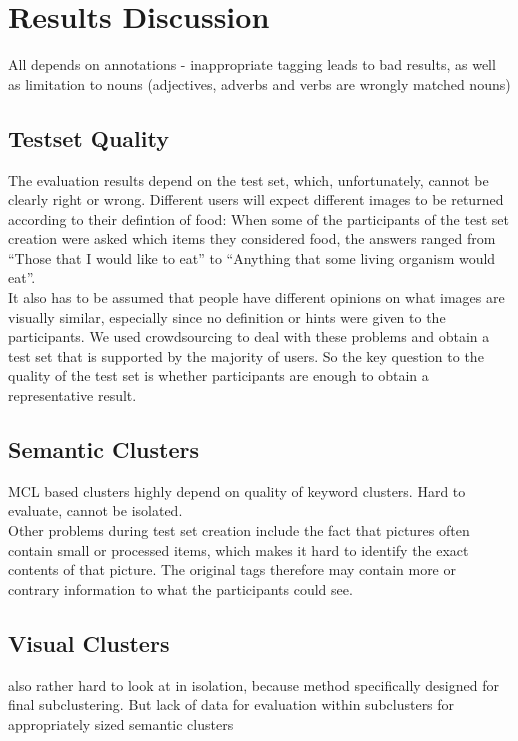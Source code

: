 %
\section{Results Discussion}
\label{sec_discussion}


All depends on annotations - inappropriate tagging leads to bad results, as well as limitation to nouns (adjectives, adverbs and verbs are wrongly matched nouns)

\subsection{Testset Quality}
The evaluation results depend on the test set, which, unfortunately, cannot be clearly right or wrong. Different users will expect different images to be returned according to their defintion of food: When some of the participants of the test set creation were asked which items they considered food, the answers ranged from ``Those that I would like to eat'' to ``Anything that some living organism would eat''. \\
It also has to be assumed that people have different opinions on what images are visually similar, especially since no definition or hints were given to the participants. We used crowdsourcing to deal with these problems and obtain a test set that is supported by the majority of users. So the key question to the quality of the test set is whether  participants are enough to obtain a representative result.\\

\subsection{Semantic Clusters}
MCL based clusters highly depend on quality of keyword clusters. Hard to evaluate, cannot be isolated.\\
Other problems during test set creation include the fact that pictures often contain small or processed items, which makes it hard to identify the exact contents of that picture. The original tags therefore may contain more or contrary information to what the participants could see. 

\subsection{Visual Clusters}
also rather hard to look at in isolation, because method specifically designed for final subclustering. But lack of data for evaluation within subclusters for appropriately sized semantic clusters